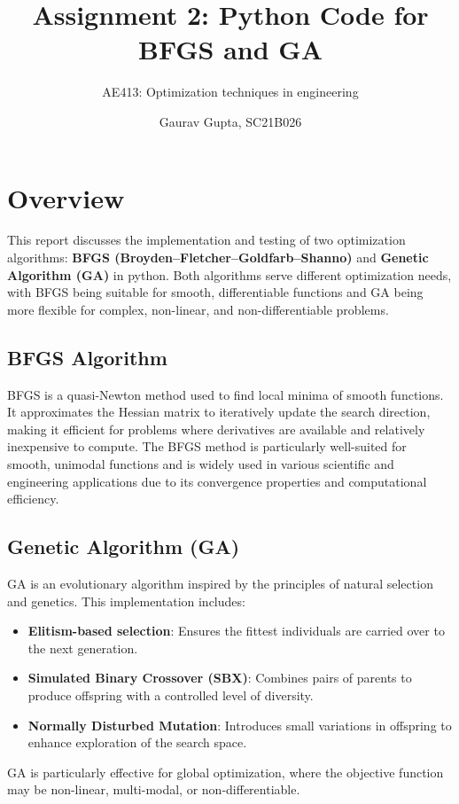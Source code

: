 \documentclass[12pt,a4paper,oneside]{paper} %
\title{Assignment 2: Python Code for BFGS and GA}
\subtitle{AE413: Optimization techniques in engineering}
\author{Gaurav Gupta, SC21B026}
\begin{document}
\maketitle


\section{Overview}

This report discusses the implementation and testing of two optimization algorithms: \textbf{BFGS (Broyden–Fletcher–Goldfarb–Shanno)} and \textbf{Genetic Algorithm (GA)} in python. Both algorithms serve different optimization needs, with BFGS being suitable for smooth, differentiable functions and GA being more flexible for complex, non-linear, and non-differentiable problems.

\subsection*{BFGS Algorithm}
BFGS is a quasi-Newton method used to find local minima of smooth functions. It approximates the Hessian matrix to iteratively update the search direction, making it efficient for problems where derivatives are available and relatively inexpensive to compute. The BFGS method is particularly well-suited for smooth, unimodal functions and is widely used in various scientific and engineering applications due to its convergence properties and computational efficiency.

\subsection*{Genetic Algorithm (GA)}
GA is an evolutionary algorithm inspired by the principles of natural selection and genetics. This implementation includes:
\begin{itemize}
    \item \textbf{Elitism-based selection}: Ensures the fittest individuals are carried over to the next generation.
    \item \textbf{Simulated Binary Crossover (SBX)}: Combines pairs of parents to produce offspring with a controlled level of diversity.
    \item \textbf{Normally Disturbed Mutation}: Introduces small variations in offspring to enhance exploration of the search space.
\end{itemize}
GA is particularly effective for global optimization, where the objective function may be non-linear, multi-modal, or non-differentiable.
\end{document}

